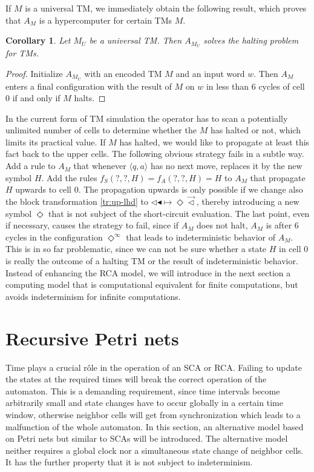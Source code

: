 \documentclass[pre,amssymb,showpacs,showkeys,preprint]{revtex4}
\newtheorem{cor}{Corollary}
\begin{document}
If $M$ is a universal TM, we immediately obtain the following result, which proves that $A_M$ is a hypercomputer
for certain TMs $M$.
\begin{cor}
Let $M_U$ be a universal TM. Then $A_{M_U}$ solves the halting problem for TMs.
\end{cor}
\begin{proof}
Initialize $A_{M_U}$ with an encoded TM $M$ and an input word $w$.
Then $A_M$ enters a final configuration with the result of $M$ on $w$ in less than 6 cycles of cell 0 if and only if $M$ halts.
\end{proof}

In the current form of TM simulation the operator has to scan a potentially unlimited number of cells to determine whether the
$M$ has halted or not, which limits its practical value.
If $M$ has halted, we would like to propagate at least this fact back to the upper cells.
The following obvious strategy fails in a subtle way.
Add a rule to $A_M$ that whenever $\langle q, a \rangle$ has no next move, replaces it by the new symbol $H$.
Add the rules $f_S(?, ?, H) = f_A(?, ?, H) = H$ to $A_M$
that propagate $H$ upwards to cell $0$.
The propagation upwards is only possible if we change also the block transformation \ref{tr:up-lhd}  to
$\lhd  \blacktriangleleft \mapsto \Diamond  \overrightarrow{\lhd}$,
thereby introducing a new symbol $\Diamond$ that is not subject
of the short-circuit evaluation.
The last point, even if necessary, causes the strategy to fail, since if $A_M$ does not halt,
$A_M$ is after 6 cycles in the configuration $\Diamond^\infty$ that
leads to indeterministic behavior of $A_M$.
This is in so far problematic, since we can not be sure whether a state $H$ in cell $0$
is really the outcome of a halting TM or the result of indeterministic behavior.
Instead of enhancing the RCA model, we will introduce in the next section a computing model
that is computational equivalent for finite computations, but avoids indeterminism for infinite
computations.

\section{Recursive Petri nets}
\label{chap:petri}

Time plays a crucial r\^ole in the operation of an SCA or RCA.
Failing to update the states at the required times will break the correct operation of the automaton.
This is a demanding requirement, since time intervals become arbitrarily small and
state changes have to occur globally in a certain time window, otherwise neighbor cells will get from synchronization
which leads to a malfunction of the whole automaton.
In this section, an alternative model based on Petri nets but similar to SCAs will be introduced.
The alternative model neither requires a global clock nor a simultaneous state change of neighbor cells.
It has the further property that it is not subject to indeterminism.
\end{document}
